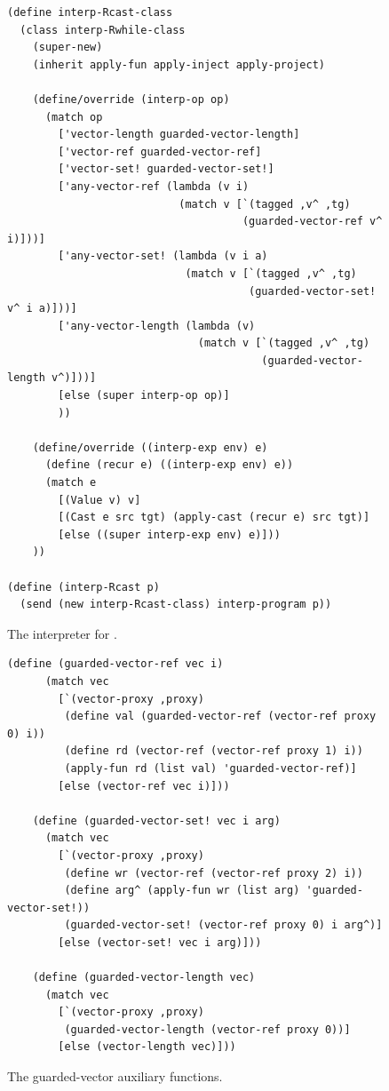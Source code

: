 \documentclass[11pt]{book}
\begin{document}
\begin{figure}[tbp]
\begin{lstlisting}[basicstyle=\ttfamily\footnotesize]
(define interp-Rcast-class
  (class interp-Rwhile-class
    (super-new)
    (inherit apply-fun apply-inject apply-project)

    (define/override (interp-op op)
      (match op
        ['vector-length guarded-vector-length]
        ['vector-ref guarded-vector-ref]
        ['vector-set! guarded-vector-set!]
        ['any-vector-ref (lambda (v i)
                           (match v [`(tagged ,v^ ,tg)
                                     (guarded-vector-ref v^ i)]))]
        ['any-vector-set! (lambda (v i a)
                            (match v [`(tagged ,v^ ,tg)
                                      (guarded-vector-set! v^ i a)]))]
        ['any-vector-length (lambda (v)
                              (match v [`(tagged ,v^ ,tg)
                                        (guarded-vector-length v^)]))]
        [else (super interp-op op)]
        ))

    (define/override ((interp-exp env) e)
      (define (recur e) ((interp-exp env) e))
      (match e
        [(Value v) v]
        [(Cast e src tgt) (apply-cast (recur e) src tgt)]
        [else ((super interp-exp env) e)]))
    ))

(define (interp-Rcast p)
  (send (new interp-Rcast-class) interp-program p))
\end{lstlisting}
\caption{The interpreter for \LangCast{}.}
  \label{fig:interp-Rcast}
\end{figure}


\begin{figure}[tbp]
\begin{lstlisting}[basicstyle=\ttfamily\footnotesize]
    (define (guarded-vector-ref vec i)
      (match vec
        [`(vector-proxy ,proxy)
         (define val (guarded-vector-ref (vector-ref proxy 0) i))
         (define rd (vector-ref (vector-ref proxy 1) i))
         (apply-fun rd (list val) 'guarded-vector-ref)]
        [else (vector-ref vec i)]))
        
    (define (guarded-vector-set! vec i arg)
      (match vec
        [`(vector-proxy ,proxy)
         (define wr (vector-ref (vector-ref proxy 2) i))
         (define arg^ (apply-fun wr (list arg) 'guarded-vector-set!))
         (guarded-vector-set! (vector-ref proxy 0) i arg^)]
        [else (vector-set! vec i arg)]))
        
    (define (guarded-vector-length vec)
      (match vec
        [`(vector-proxy ,proxy)
         (guarded-vector-length (vector-ref proxy 0))]
        [else (vector-length vec)]))
\end{lstlisting}
\caption{The guarded-vector auxiliary functions.}
  \label{fig:guarded-vector}
\end{figure}
\end{document}
